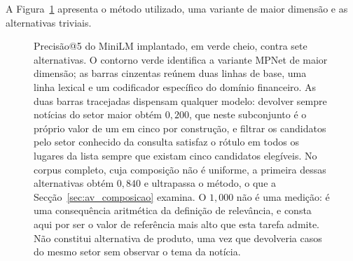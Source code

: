 A Figura~\ref{fig:av_recuperacao} apresenta o método utilizado, uma variante de maior dimensão e as
alternativas triviais.

\begin{figure}[htbp]
\centering
{}
\caption[Recuperação: o método contra sete alternativas]{Precisão@5 do MiniLM implantado, em verde
cheio, contra sete alternativas. O contorno verde identifica a variante MPNet de maior dimensão; as
barras cinzentas reúnem duas linhas de base, uma linha lexical e um codificador específico do domínio
financeiro. As duas barras tracejadas dispensam qualquer modelo: devolver sempre notícias do setor
maior obtém $0{,}200$, que neste subconjunto é o próprio valor de um em cinco por construção, e
filtrar
os candidatos pelo setor conhecido da consulta satisfaz o rótulo em todos os lugares da lista sempre
que existam cinco candidatos elegíveis. No corpus completo, cuja composição não é uniforme, a
primeira dessas alternativas obtém $0{,}840$ e ultrapassa o método, o que a
Secção~\ref{sec:av_composicao} examina. O $1{,}000$ não é uma medição: é uma consequência
aritmética da definição de relevância, e consta aqui por ser o valor de referência mais alto que
esta tarefa admite. Não constitui alternativa de produto, uma vez que devolveria casos do mesmo
setor sem observar o tema da notícia.}
\label{fig:av_recuperacao}
\end{figure}

